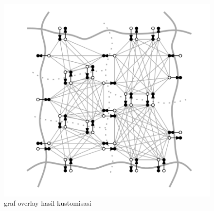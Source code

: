 \begin{figure}[H]
    \centering
    \includegraphics[]{figures/clique.png}
    \caption{graf overlay hasil kustomisasi}
    \label{fig:clique-crp}
\end{figure}




